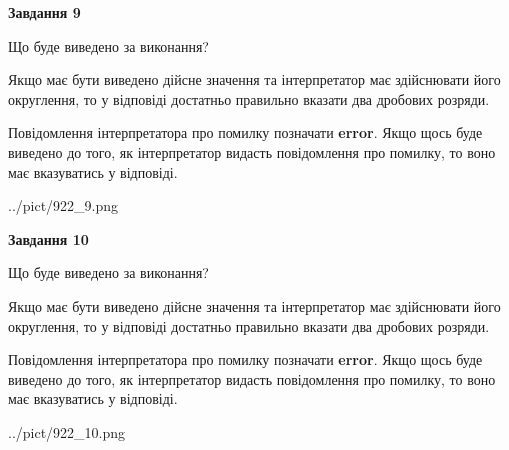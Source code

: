 \documentclass[12pt, ukrainian]{article}
\begin{document}
{\begin {Large}
{\begin {center}\textbf{Завдання 9}\end {center}}\par
Що буде виведено за виконання? \par

Якщо має бути виведено дійсне значення та інтерпретатор має здійснювати його округлення, 
то у відповіді достатньо правильно вказати два дробових розряди.

Повідомлення інтерпретатора про помилку позначати \textbf{error}.
Якщо щось буде виведено до того, як інтерпретатор видасть повідомлення про помилку, 
то воно має вказуватись у відповіді. \par

\begin{center}
	{../pict/922_9.png}
\end{center}
\newpage

{\begin {center}\textbf{Завдання 10}\end {center}}\par
Що буде виведено за виконання? \par

Якщо має бути виведено дійсне значення та інтерпретатор має здійснювати його округлення, 
то у відповіді достатньо правильно вказати два дробових розряди.

Повідомлення інтерпретатора про помилку позначати \textbf{error}.
Якщо щось буде виведено до того, як інтерпретатор видасть повідомлення про помилку, 
то воно має вказуватись у відповіді. \par

\begin{center}
	{../pict/922_10.png}
\end{center}
\newpage

\end {Large}}
\end{document}
